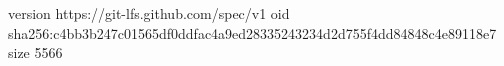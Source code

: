 version https://git-lfs.github.com/spec/v1
oid sha256:c4bb3b247c01565df0ddfac4a9ed28335243234d2d755f4dd84848c4e89118e7
size 5566
